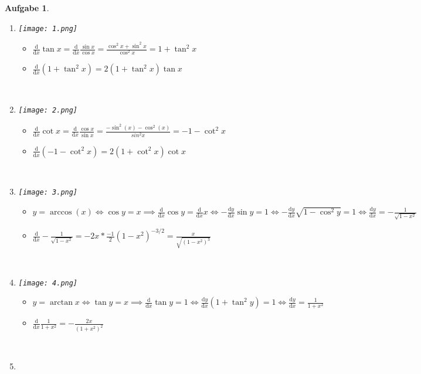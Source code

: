 \documentclass[a4paper,11pt,parskip=half,fleqn]{scrartcl}
\newcommand{\wrt}[1]{\mathrm{d}{#1}}
\newcommand{\diff}[1]{\frac{\mathrm{d}}{\wrt{#1}}}
\newcommand{\difff}[2]{\frac{\wrt{#1}}{\wrt{#2}}}
\theoremstyle{note}
\newtheorem{aufgabe}{Aufgabe}
\begin{document}
\begin{aufgabe}
  \begin{enumerate}
    ~\item 
      \begin{minipage}{\linewidth}
	\texttt{[image: 1.png]} 
      \end{minipage}
      \begin{itemize}
	\item $\diff{x}\tan x=\diff{x}\frac{\sin x}{\cos x}=\frac{\cos^2 x+\sin^2 x}{\cos^2 x}=1+\tan^2 x$
	\item $\diff{x}(1+\tan^2x)=2(1+\tan^2x)\tan x$
      \end{itemize}
    ~\item 
      \begin{minipage}{\linewidth}
	\texttt{[image: 2.png]} 
      \end{minipage}
      \begin{itemize}
	\item $\diff{x}\cot x=\diff{x}\frac{\cos x}{\sin x}=\frac{-\sin^2(x)-\cos^2(x)}{sin^2 x}=-1-\cot^2 x$
	\item $\diff{x}(-1-\cot^2 x)=2(1+\cot^2 x)\cot x$
      \end{itemize}
    ~\item 
      \begin{minipage}{\linewidth}
	\texttt{[image: 3.png]} 
      \end{minipage}
      \begin{itemize}
	\item $y=\arccos(x)\iff\cos y=x\implies\diff{x}\cos y=\diff{x}x\iff-\difff{y}{x}\sin y=1\iff -\difff{y}{x}\sqrt{1-\cos^2 y}=1\iff\difff{y}{x}=-\frac{1}{\sqrt{1-x^2}}$
	\item $\diff{x}-\frac{1}{\sqrt{1-x^2}}=-2x*\frac{-1}{2}(1-x^2)^{-3/2}=\frac{x}{\sqrt{(1-x^2)^3}}$
      \end{itemize}
    ~\item 
      \begin{minipage}{\linewidth}
	\texttt{[image: 4.png]} 
      \end{minipage}
      \begin{itemize}
	\item $y=\arctan x\iff\tan y=x\implies\diff{x}\tan y=1\iff\difff{y}{x}(1+\tan^2y)=1\iff\difff{y}{x}=\frac{1}{1+x^2}$
	\item $\diff{x}\frac{1}{1+x^2}=-\frac{2x}{(1+x^2)^2}$
      \end{itemize}
    ~\item 
      \begin{minipage}{\linewidth}

\end{minipage}
\end{enumerate}
\end{aufgabe}
\end{document}
